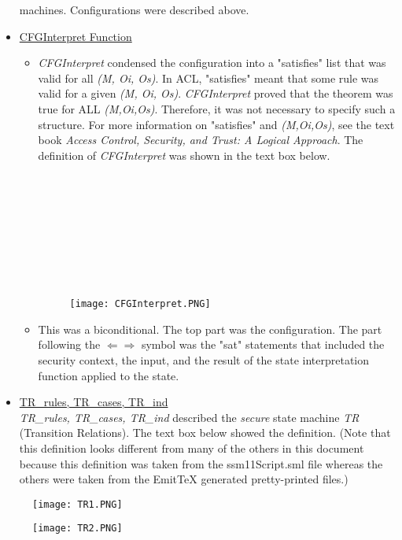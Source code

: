 \begin{itemize}
  machines.  Configurations were described above.
\item
  \underline{CFGInterpret Function}
  \begin{itemize}
  \item \textit{CFGInterpret} condensed the configuration into a "satisfies" list that was valid for all
  \textit{(M, Oi, Os)}.  In ACL, "satisfies" meant that some rule was valid for a given
  \textit{(M, Oi, Os)}.  \textit{CFGInterpret} proved that the theorem was true for ALL
  \textit{(M,Oi,Os)}.  Therefore, it was not necessary to specify such a structure.  For
  more information on "satisfies" and \textit{(M,Oi,Os)}, see the text book
  \textit{Access Control, Security, and Trust: A Logical Approach}.  The definition of
  \textit{CFGInterpret} was shown in the text box below.\\\\\\\\\\\\\\\\\\
  \begin{figure}[h]
  \centering
  \texttt{[image: CFGInterpret.PNG]}
\end{figure}
\item This was a biconditional.  The top part was the configuration.   The part following
  the $\Leftarrow \Rightarrow$ symbol was the "sat" statements that included the security context, the input,
  and the result of the state interpretation function applied to the state.
\end{itemize}
\item \underline{TR_rules, TR_cases, TR_ind}\\
  \textit{TR_rules, TR_cases, TR_ind} described the \textit{secure} state machine \textit{TR}
  (Transition Relations).  The text box below showed the definition.  (Note that this definition
  looks different from many of the others in this document because this definition was taken from
  the ssm11Script.sml file whereas the others were taken from the EmitTeX generated pretty-printed files.)
  \end{itemize}
  \begin{figure}[h]
  \centering
  \texttt{[image: TR1.PNG]}
\end{figure}
\begin{figure}[h!]
  \centering
  \texttt{[image: TR2.PNG]}
\end{figure}
